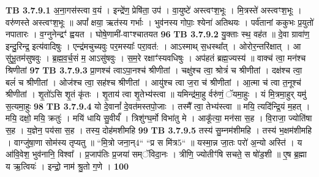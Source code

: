 \documentclass[17pt]{extarticle}
\begin{document}
{{{{{{{{{{{{{{{{{{{                                \textbf{ TB 3.7.9.1} \newline
                  अ॒ना॒गस॑स्त्वा व॒यं । इन्द्रे॑ण॒ प्रेषि॑ता॒ उप॑ । वा॒युष्टे॑ अस्त्वꣳश॒भूः । मि॒त्रस्ते॑ अस्त्वꣳश॒भूः । वरु॑णस्ते अस्त्वꣳश॒भूः ॥ अपां᳚ क्षया॒ ऋत॑स्य गर्भाः । भुव॑नस्य गोपाः॒ श्येना॑ अतिथयः । पर्व॑तानां ककुभः प्र॒युतो॑ नपातारः । व॒ग्नुनेन्द्रꣳ॑ ह्वयत । घोषे॒णामी॑-वाꣳश्चातयत \textbf{ 96} \newline
                  \newline
                                \textbf{ TB 3.7.9.2} \newline
                  यु॒क्ताः स्थ॒ वह॑त ॥ दे॒वा ग्रावा॑ण॒ इन्दु॒रिन्द्र॒ इत्य॑वादिषुः । एन्द्र॑मचुच्यवुः पर॒मस्याः᳚ परा॒वत॑: । आऽस्माथ् स॒धस्था᳚त् । ओरोर॒न्तरि॑क्षात् । आ सु॑भू॒तम॑सुषवुः । ब्र॒ह्म॒व॒र्च॒सं म॒ आऽसु॑षवुः । स॒म॒रे रक्षाꣳ॑स्यवधिषुः । अप॑हतं ब्रह्म॒ज्यस्य॑ ॥ वाक्च॑ त्वा॒ मन॑श्च श्रिणीतां \textbf{ 97} \newline
                  \newline
                                \textbf{ TB 3.7.9.3} \newline
                  प्रा॒णश्च॑ त्वाऽपा॒नश्च॑ श्रीणीतां । चक्षु॑श्च त्वा॒ श्रोत्रं॑ च श्रीणीतां । दक्ष॑श्च त्वा॒ बलं॑ च श्रीणीतां । ओज॑श्च त्वा॒ सह॑श्च श्रीणीतां । आयु॑श्च त्वा ज॒रा च॑ श्रीणीतां । आ॒त्मा च॑ त्वा त॒नूश्च॑ श्रीणीतां । शृ॒तो॑ऽसि शृ॒तं कृ॑तः । शृ॒ताय॑ त्वा शृ॒तेभ्य॑स्त्वा ॥ यमिन्द्र॑मा॒हु र्वरु॑णं॒ ॅयमा॒हुः । यं मि॒त्रमा॒हुर् यमु॑ स॒त्यमा॒हुः \textbf{ 98} \newline
                  \newline
                                \textbf{ TB 3.7.9.4} \newline
                  यो दे॒वानां᳚ दे॒वत॑मस्तपो॒जाः । तस्मै᳚ त्वा॒ तेभ्य॑स्त्वा ॥ मयि॒ त्यदि॑न्द्रि॒यं म॒हत् । मयि॒ दक्षो॒ मयि॒ क्रतुः॑ । मयि॑ धायि सु॒वीर्यं᳚ । त्रिशु॑ग्घ॒र्मो विभा॑तु मे । आकू᳚त्या॒ मन॑सा स॒ह । वि॒राजा॒ ज्योति॑षा स॒ह । य॒ज्ञेन॒ पय॑सा स॒ह । तस्य॒ दोह॑मशीमहि \textbf{ 99} \newline
                  \newline
                                \textbf{ TB 3.7.9.5} \newline
                  तस्य॑ सु॒म्नम॑शीमहि । तस्य॑ भ॒क्षम॑शीमहि । वाग्जु॑षा॒णा सोम॑स्य तृप्यतु ॥ “मि॒त्रो जना॒न्{4}“ “प्र स मि॑त्र{5}“ ॥ यस्मा॒न्न जा॒तः परो॑ अ॒न्यो अस्ति॑ । य आ॑वि॒वेश॒ भुव॑नानि॒ विश्वा᳚ । प्र॒जाप॑तिः प्र॒जया॑ सम्ॅविदा॒नः । त्रीणि॒ ज्योतीꣳ॑षि सचते॒ स षो॑ड॒शी ॥ ए॒ष ब्र॒ह्मा य ऋ॒त्वियः॑ । इन्द्रो॒ नाम॑ श्रु॒तो ग॒णे । \textbf{ 100} \newline
}}}}}}}}}}}}}}}}}}}
\end{document}
